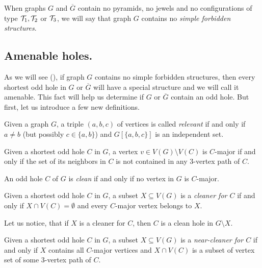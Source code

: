When graphs $G$ and $\overline{G}$ contain no pyramids, no jewels and no configurations of type $\mathcal{T}_1, \mathcal{T}_2$ or $\mathcal{T}_3$, we will say that graph $G$ contains no \emph{simple forbidden structures}.

\subsection{Amenable holes.}
\label{AmenableHoles}
As we will see (), if graph $G$ contains no simple forbidden structures, then every shortest odd hole in $G$ or $\overline{G}$ will have a special structure and we will call it amenable. This fact will help us determine if $G$ or $\overline{G}$ contain an odd hole. But first, let us introduce a few new definitions.

\begin{defn}
	Given a graph $G$, a triple $(a, b, c)$ of vertices is called \emph{relevant} if and only if $a \neq b$ (but possibly $c \in \{a, b\}$) and $G[\{a,b,c\}]$ is an independent set.
\end{defn}

\begin{defn}
  Given a shortest odd hole $C$ in $G$, a vertex $v \in V(G) \setminus V(C)$ is $C$-major if and only if the set of its neighbors in $C$ is not contained in any 3-vertex path of $C$.
\end{defn}

\begin{defn}
  An odd hole $C$ of $G$ is \emph{clean} if and only if no vertex in $G$ is $C$-major.
\end{defn}

\begin{defn}[cleaner]
  Given a shortest odd hole $C$ in $G$, a subset $X \subseteq V(G)$ is a \emph{cleaner for $C$} if and only if $X \cap V(C) = \emptyset$ and every $C$-major vertex belongs to $X$.
\end{defn}

\noindent Let us notice, that if $X$ is a cleaner for $C$, then $C$ is a clean hole in $G \setminus X$.

\begin{defn}
  Given a shortest odd hole $C$ in $G$, a subset $X \subseteq V(G)$ is a \emph{near-cleaner for $C$} if and only if $X$ contains all $C$-major vertices and $X \cap V(C)$ is a subset of vertex set of some 3-vertex path of $C$.
\end{defn}

